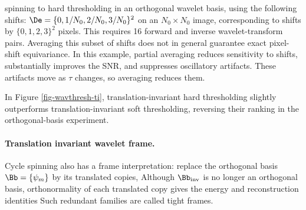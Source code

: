  spinning to hard thresholding in an orthogonal wavelet basis, using the following shifts:
$\De = \{ 0, 1/N_0, 2/N_0, 3/N_0 \}^2$ on an $N_0\times N_0$ image, corresponding to shifts by $\{ 0, 1, 2, 3 \}^2$ pixels.
This requires 16 forward and inverse wavelet-transform pairs. Averaging this subset of shifts does not in general guarantee exact pixel-shift equivariance. In this example, partial averaging reduces sensitivity to shifts, substantially improves the SNR, and suppresses oscillatory artifacts. These artifacts move as $\tau$ changes, so averaging reduces them.

In Figure \ref{fig-wavthresh-ti}, translation-invariant hard thresholding slightly outperforms translation-invariant soft thresholding, reversing their ranking in the orthogonal-basis experiment.                                                                                               





                                      
                                                                                                                                                                                                                         

  
\paragraph{Translation invariant wavelet frame.}

Cycle spinning also has a frame interpretation: replace the orthogonal basis $\Bb = \{\psi_m\}$ by its translated copies,
Although $\Bb_{\text{inv}}$ is no longer an orthogonal basis, orthonormality of each translated copy gives the energy and reconstruction identities
Such redundant families are called tight frames.

